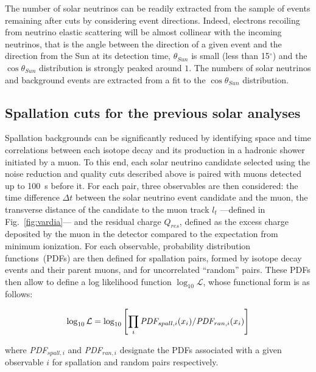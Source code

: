 The number of solar neutrinos can be readily extracted from the sample of events remaining after cuts by considering event directions. Indeed, electrons recoiling from neutrino elastic scattering will be almost collinear with the incoming neutrinos, that is the angle between the direction of a given event and the direction from the Sun at its detection time, $\theta_{Sun}$ is small (less than 15$^\circ$) and the $\cos\theta_{Sun}$ distribution is strongly peaked around $1$. The numbers of solar neutrinos and background events are extracted from a fit to the $\cos\theta_{Sun}$ distribution.


\subsection{Spallation cuts for the previous solar analyses}
\label{sec:spaprevious}
Spallation backgrounds can be significantly reduced by identifying space and time correlations between each isotope decay and its production in a hadronic shower initiated by a muon. To this end, each solar neutrino candidate selected using the noise reduction and quality cuts described above is paired with muons detected up to 100~s before it. For each pair, three observables are then considered: the time difference $\Delta t$ between the solar neutrino event candidate and the muon, the transverse distance of the candidate to the muon track $l_t$ ---defined in Fig.~\ref{fig:vardia}--- and the residual charge $Q_{res}$, defined as the excess charge deposited by the muon in the detector compared to the expectation from minimum ionization. For each observable, probability distribution functions~(PDFs) are then defined for spallation pairs, formed by isotope decay events and their parent muons, and for uncorrelated ``random'' pairs. These PDFs then allow to define a log likelihood function $\log_{10}\mathcal{L}$, whose functional form is as follows:

\begin{equation}
    \log_{10}\mathcal{L} = \log_{10} \left[ \prod_i \mbox{\it PDF}_{spall,i}(x_i)/\mbox{\it PDF}_{ran,i}(x_i) \right]
    \label{eq:loglike}
\end{equation}

\noindent where {\it PDF}$_{spall,i}$ and {\it PDF}$_{ran,i}$ designate the PDFs associated with a given observable $i$ for spallation and random pairs respectively. 

